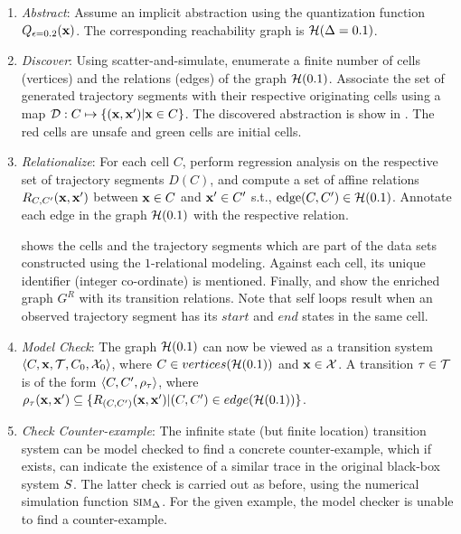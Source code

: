 \begin{enumerate}
    \item{\emph{Abstract}}: Assume an implicit abstraction using the quantization
        function $Q_{\epsilon=0.2}(\mathbf{x})$. The corresponding reachability
    graph is $\mathcal{H}(\Delta=0.1)$.
\item{\emph{Discover}}: Using scatter-and-simulate, enumerate a finite number
    of cells (vertices) and the relations (edges) of the graph
    $\mathcal{H}(0.1)$. Associate the set of generated trajectory
    segments with their respective originating cells using a map $\mathcal{D}:C
        \mapsto \{(\mathbf{x},\mathbf{x}') |\mathbf{x} \in C\}$. The discovered
    abstraction is show in . The red cells
    are unsafe and green cells are initial cells.
\item{\emph{Relationalize}}: For each cell $C$, perform regression analysis on
    the respective set of trajectory segments $D(C)$, and compute a
    set of affine relations $R_{C,C'}(\mathbf{x},\mathbf{x}')$ between $\mathbf{x} \in C$ and $\mathbf{x}'
    \in C'$ s.t., $\text{edge} (C,C') \in \mathcal{H}(0.1)$. Annotate
    each edge in the graph $\mathcal{H}(0.1)$ with the respective
    relation.

     shows the cells and the trajectory segments which
    are part of the data sets constructed using the $1$-relational
    modeling. Against each cell, its unique identifier (integer
    co-ordinate) is mentioned.  Finally,  and
     show the enriched graph $G^R$ with its transition
    relations. Note that self loops result when an observed trajectory
    segment has its $start$ and $end$ states in the same cell.

\item{\emph{Model Check}}: The graph $\mathcal{H}(0.1)$ can now be viewed as a
    transition system $\left\langle C,\mathbf{x},\mathcal{T},C_0,\mathcal{X}_0 \right \rangle$,
    where $C \in vertices(\mathcal{H}(0.1))$ and $\mathbf{x} \in
    \mathcal{X}$. A transition $\tau \in \mathcal{T}$ is of the form
    $\left\langle C, C',\rho_{\tau} \right \rangle$, where $\rho_{\tau}(\mathbf{x},\mathbf{x}')
    \subseteq \{R_{(C,C')}(\mathbf{x},\mathbf{x}') |( C,C') \in
    edge(\mathcal{H}(0.1))\}$.
\item{\emph{Check Counter-example}}: The infinite state (but finite location) transition system can
    be model checked to find a concrete counter-example, which if
    exists, can indicate the existence of a similar trace in the
    original black-box system $S$. The latter check is carried
    out as before, using the numerical simulation function
    $\mbox{\sc sim}_\Delta$. For the given example, the model checker is unable to
    find a counter-example.
\end{enumerate}

